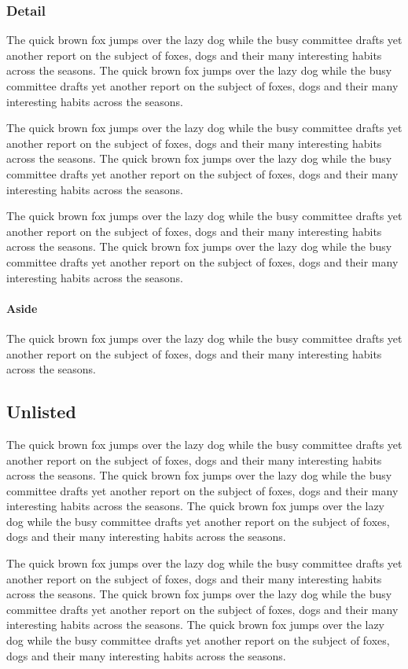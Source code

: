 \documentclass{article}
\begin{document}
\subsubsection{Detail}
The quick brown fox jumps over the lazy dog while the busy committee drafts yet another report on the subject of foxes, dogs and their many interesting habits across the seasons. The quick brown fox jumps over the lazy dog while the busy committee drafts yet another report on the subject of foxes, dogs and their many interesting habits across the seasons. 

The quick brown fox jumps over the lazy dog while the busy committee drafts yet another report on the subject of foxes, dogs and their many interesting habits across the seasons. The quick brown fox jumps over the lazy dog while the busy committee drafts yet another report on the subject of foxes, dogs and their many interesting habits across the seasons. 

The quick brown fox jumps over the lazy dog while the busy committee drafts yet another report on the subject of foxes, dogs and their many interesting habits across the seasons. The quick brown fox jumps over the lazy dog while the busy committee drafts yet another report on the subject of foxes, dogs and their many interesting habits across the seasons. 

\paragraph{Aside} The quick brown fox jumps over the lazy dog while the busy committee drafts yet another report on the subject of foxes, dogs and their many interesting habits across the seasons. 
\subsection*{Unlisted}
The quick brown fox jumps over the lazy dog while the busy committee drafts yet another report on the subject of foxes, dogs and their many interesting habits across the seasons. The quick brown fox jumps over the lazy dog while the busy committee drafts yet another report on the subject of foxes, dogs and their many interesting habits across the seasons. The quick brown fox jumps over the lazy dog while the busy committee drafts yet another report on the subject of foxes, dogs and their many interesting habits across the seasons. 

The quick brown fox jumps over the lazy dog while the busy committee drafts yet another report on the subject of foxes, dogs and their many interesting habits across the seasons. The quick brown fox jumps over the lazy dog while the busy committee drafts yet another report on the subject of foxes, dogs and their many interesting habits across the seasons. The quick brown fox jumps over the lazy dog while the busy committee drafts yet another report on the subject of foxes, dogs and their many interesting habits across the seasons. 
\end{document}
